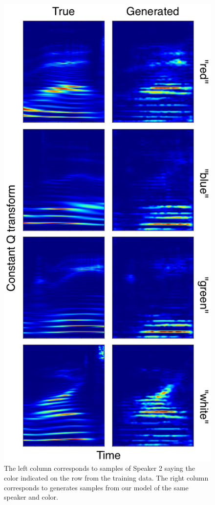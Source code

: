 \documentclass{article}
\begin{document}
\begin{figure}[htp!]
    \centering
    \includegraphics[scale=0.40]{results.png}
    \caption{The left column corresponds to samples of Speaker 2 saying the color indicated on the row from the training data. The right column corresponds to generates samples from our model of the same speaker and color.}
    \label{results}
\end{figure}
\end{document}
